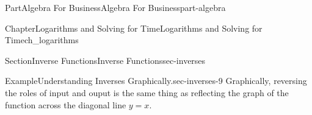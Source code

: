 \documentclass{tufte-book}
\numberwithin{equation}{chapter}
\begin{document}
\begin{partptx}{Part}{Algebra For Business}{}{Algebra For Business}{}{}{part-algebra}
\begin{chapterptx}{Chapter}{Logarithms and Solving for Time}{}{Logarithms and Solving for Time}{}{}{ch_logarithms}
\begin{sectionptx}{Section}{Inverse Functions}{}{Inverse Functions}{}{}{sec-inverses}
\begin{example}{Example}{Understanding Inverses Graphically.}{sec-inverses-9}
Graphically, reversing the roles of input and ouput is the same thing as reflecting the graph of the function across the diagonal line \(y=x\).%
\begin{image}{0}{1}{0}{}%
\end{image}
\end{example}
\end{sectionptx}
\end{chapterptx}
\end{partptx}
\end{document}
